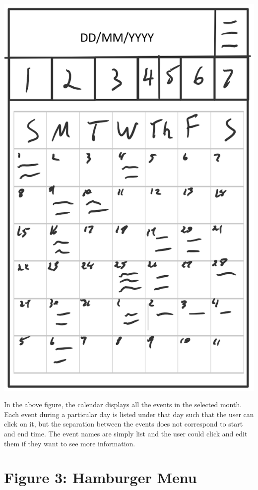 \documentclass{scrreprt}
\begin{document}
\begin{center}
\includegraphics{month.PNG}
\end{center}


In the above figure, the calendar displays all the events in the selected month.  Each event during a particular day is listed under that day such that the user can click on it, but the separation between the events does not correspond to start and end time.  The event names are simply list and the user could click and edit them if they want to see more information.

\section{Figure 3: Hamburger Menu}
\end{document}

